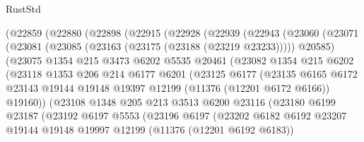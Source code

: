 \begin{lexlean}{RustStd}
\begin{coremodule}
{\begin{coremodule}
{{{{{{{{{{{{{{{{{{{{{{{{{{{{{{{{{{{{{{{{{{{{{{{{{{{{{{{{{{{{{{{{{{{{{{{{{{{{{{{{{{{{{          (@22859
            (@22880
              (@22898
                (@22915
                  (@22928
                    (@22939
                      (@22943
                        (@23060
                          (@23071
                            (@23081 (@23085 (@23163 (@23175 (@23188 (@23219 @23233))))) @20585)
                            (@23075
                              @1354
                              @215
                              @3473
                              @6202
                              @5535
                              @20461
                              (@23082
                                @1354
                                @215
                                @6202
                                (@23118
                                  @1353
                                  @206
                                  @214
                                  @6177
                                  @6201
                                  (@23125
                                    @6177
                                    (@23135
                                      @6165
                                      @6172
                                      @23143
                                      @19144
                                      @19148
                                      @19397
                                      @12199
                                      (@11376 (@12201 @6172 @6166))
                                      @19160))
                                  (@23108
                                    @1348
                                    @205
                                    @213
                                    @3513
                                    @6200
                                    @23116
                                    (@23180
                                      @6199
                                      @23187
                                      (@23192
                                        @6197
                                        @5553
                                        (@23196
                                          @6197
                                          (@23202
                                            @6182
                                            @6192
                                            @23207
                                            @19144
                                            @19148
                                            @19997
                                            @12199
                                            (@11376 (@12201 @6192 @6183))
}}}}}}}}}}}}}}}}}}}}}}}}}}}}}}}}}}}}}}}}}}}}}}}}}}}}}}}}}}}}}}}}}}}}}}}}}}}}}}}}}}}}}
\end{coremodule}}
\end{coremodule}
\end{lexlean}
